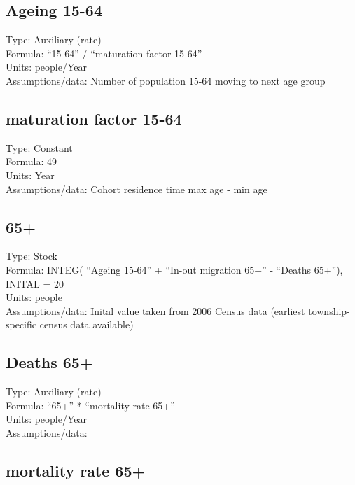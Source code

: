 \documentclass[
  11pt,
]{book}
\begin{document}
\hypertarget{ageing-15-64}{%
\subsection{Ageing 15-64}\label{ageing-15-64}}

Type: Auxiliary (rate)\\
Formula: ``15-64'' / ``maturation factor 15-64''\\
Units: people/Year\\
Assumptions/data: Number of population 15-64 moving to next age group

\hypertarget{maturation-factor-15-64}{%
\subsection{maturation factor 15-64}\label{maturation-factor-15-64}}

Type: Constant\\
Formula: 49\\
Units: Year\\
Assumptions/data: Cohort residence time max age - min age

\hypertarget{section-2}{%
\subsection{65+}\label{section-2}}

Type: Stock\\
Formula: INTEG( ``Ageing 15-64'' + ``In-out migration 65+'' - ``Deaths 65+''), INITAL = 20\\
Units: people\\
Assumptions/data: Inital value taken from 2006 Census data (earliest township-specific census data available)

\hypertarget{deaths-65}{%
\subsection{Deaths 65+}\label{deaths-65}}

Type: Auxiliary (rate)\\
Formula: ``65+'' * ``mortality rate 65+''\\
Units: people/Year\\
Assumptions/data:

\hypertarget{mortality-rate-65}{%
\subsection{mortality rate 65+}\label{mortality-rate-65}}
\end{document}
